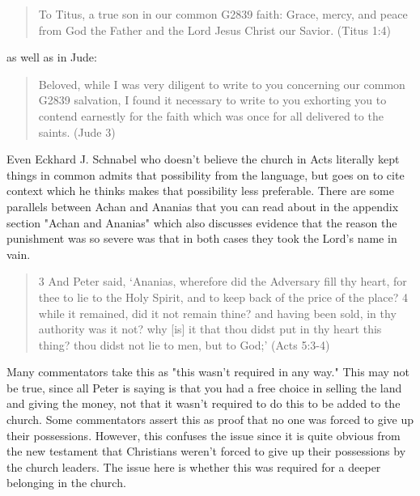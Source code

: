 \documentclass[11pt]{article}
\begin{document}
\begin{quote}
To Titus, a true son in our common G2839 faith: Grace, mercy, and peace from God the Father and the Lord Jesus Christ our Savior. (Titus 1:4)
\end{quote} as well as in Jude: 
\begin{quote}
Beloved, while I was very diligent to write to you concerning our common G2839 salvation, I found it necessary to write to you exhorting you to contend earnestly for the faith which was once for all delivered to the saints. (Jude 3)
\end{quote}
Even Eckhard J. Schnabel who doesn't believe the church in Acts literally kept things in common admits that possibility from the language, but goes on to cite context which he thinks makes that possibility less preferable.\cite{Essenes common property} There are some parallels between Achan and Ananias that you can read about in the appendix section "Achan and Ananias" which also discusses evidence that the reason the punishment was so severe was that in both cases they took the Lord's name in vain. 
\begin{quote}
3 And Peter said, `Ananias, wherefore did the Adversary fill thy heart, for thee to lie to the Holy Spirit, and to keep back of the price of the place?
4 while it remained, did it not remain thine? and having been sold, in thy authority was it not? why [is] it that thou didst put in thy heart this thing? thou didst not lie to men, but to God;' (Acts 5:3-4)
\end{quote}
Many commentators take this as "this wasn't required in any way." This may not be true, since all Peter is saying is that you had a free choice in selling the land and giving the money, not that it wasn't required to do this to be added to the church. Some commentators assert this as proof that no one was forced to give up their possessions. However, this confuses the issue since it is quite obvious from the new testament that Christians weren't forced to give up their possessions by the church leaders. The issue here is whether this was required for a deeper belonging in the church.
\end{document}
